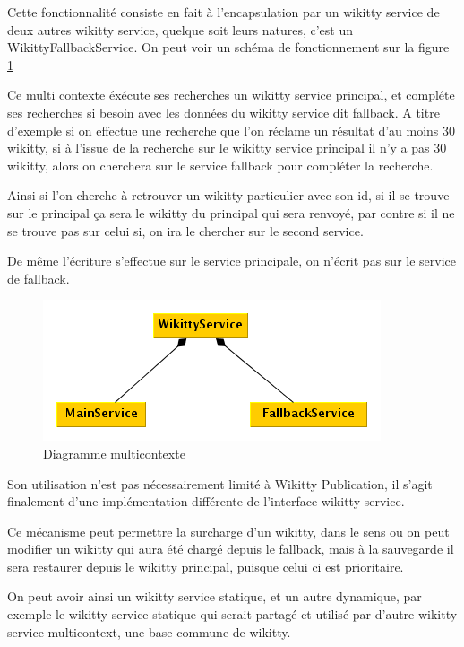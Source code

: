 Cette fonctionnalité consiste en fait à l'encapsulation par un wikitty service
de deux autres wikitty service, quelque soit leurs natures, c'est un 
WikittyFallbackService. On peut voir un schéma de fonctionnement sur la figure
\ref{diagmulticontext}

Ce multi contexte éxécute ses recherches un wikitty service principal, et
compléte ses recherches si besoin avec les données du wikitty service dit
fallback. A titre d'exemple si on effectue une recherche que l'on réclame un
résultat d'au moins 30 wikitty, si à l'issue de la recherche sur le wikitty 
service principal il n'y a pas 30 wikitty, alors on cherchera sur le service
fallback pour compléter la recherche. 

Ainsi si l'on cherche à retrouver un wikitty particulier avec son id, si il
se trouve sur le principal ça sera le wikitty du principal qui sera renvoyé, 
par contre si il ne se trouve pas sur celui si, on ira le chercher sur le second
service.

De même l'écriture s'effectue sur le service principale, on n'écrit pas sur le
service de fallback.

\begin{figure}[!ht]
\centering
\includegraphics{image/multicontext.png}
  		\caption{Diagramme multicontexte}
  		\label{diagmulticontext}
\end{figure}


Son utilisation n'est pas nécessairement limité à Wikitty Publication, il s'agit
finalement d'une implémentation différente de l'interface wikitty service. 

Ce mécanisme peut permettre la surcharge d'un wikitty, dans le sens ou on peut
modifier un wikitty qui aura été chargé depuis le fallback, mais à la sauvegarde
il sera restaurer depuis le wikitty principal, puisque celui ci est prioritaire.

On peut avoir ainsi un wikitty service statique, et un autre dynamique, par
exemple le wikitty service statique qui serait partagé et utilisé par d'autre
wikitty service multicontext, une base commune de wikitty. 

